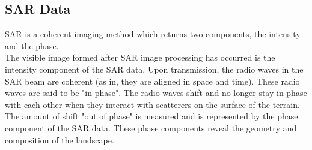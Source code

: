 \documentclass[twoside,10pt,a4paper]{article}
\numberwithin{equation}{section}					%
\numberwithin{figure}{section}						%
\begin{document}
\subsection{SAR Data}\label{sec:sar_data}
SAR is a coherent imaging method which returns two components, the intensity and the phase. \\
The visible image formed after SAR image processing has occurred is the intensity component of the SAR data.
Upon transmission, the radio waves in the SAR beam are coherent (as in, they are aligned in space and time). These radio waves are said to be "in phase". 
The radio waves shift and no longer stay in phase with each other when they interact with scatterers on the surface of the terrain. The amount of shift "out of phase" is measured and is represented by the phase component of the SAR data. These phase components reveal the geometry and composition of the landscape.
\end{document}
